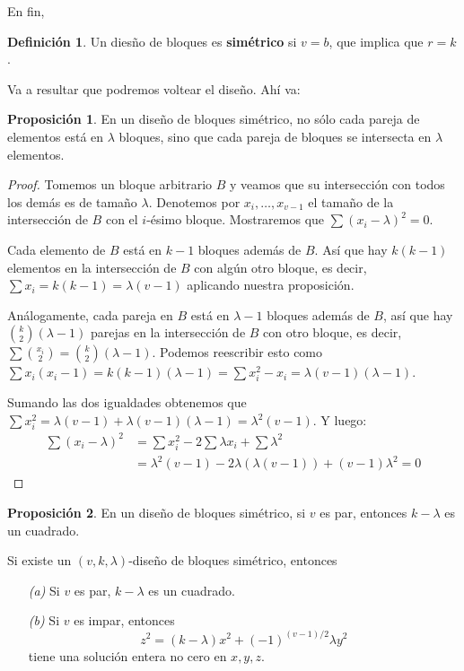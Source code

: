 \documentclass[spanish]{book}
\theoremstyle{definition}
\newtheorem*{defn}{Definición}
\newtheorem*{prop}{Proposición}
\begin{document}
En fin,
\begin{defn}
	Un diesño de bloques es \textbf{simétrico} si $v=b$, que implica que $r=k$.
\end{defn}
Va a resultar que podremos voltear el diseño. Ahí va:
\begin{prop}
	En un diseño de bloques simétrico, no sólo cada pareja de elementos está en $\lambda$ bloques, sino que cada pareja de bloques se intersecta en $\lambda$ elementos.
\end{prop}
\begin{proof}
	Tomemos un bloque arbitrario $B$ y veamos que su intersección con todos los demás es de tamaño $\lambda$. Denotemos por $x_i,\ldots,x_{v-1}$ el tamaño de la intersección de $B$ con el $i$-ésimo bloque. Mostraremos que $\sum(x_i-\lambda)^2=0$.
	
	Cada elemento de $B$ está en $k-1$ bloques además de $B$. Así que hay $k(k-1)$ elementos en la intersección de $B$ con algún otro bloque, es decir, $\sum x_i=k(k-1)=\lambda(v-1)$ aplicando nuestra proposición.
	
	Análogamente, cada pareja en $B$ está en $\lambda -1$ bloques además de $B$, así que hay ${k\choose 2}(\lambda-1)$ parejas en la intersección de $B$ con otro bloque, es decir, $\sum{x_i\choose 2}={k\choose 2}(\lambda-1)$. Podemos reescribir esto como $\sum x_i(x_i-1)=k(k-1)(\lambda-1)=\sum x_i^2-x_i=\lambda(v-1)(\lambda-1)$.
	
	Sumando las dos igualdades obtenemos que $\sum x_i^2=\lambda(v-1)+\lambda(v-1)(\lambda-1)=\lambda^2(v-1)$. Y luego:
	\begin{align*}
		\sum(x_i-\lambda)^2&=\sum x_i^2-2\sum\lambda x_i+\sum \lambda^2\\
		&=\lambda^2(v-1)-2\lambda(\lambda(v-1))+(v-1)\lambda^2=0
	\end{align*}
\end{proof}
\begin{prop}
	En un diseño de bloques simétrico, si $v$ es par, entonces $k-\lambda$ es un cuadrado.
\end{prop}
\begin{teo}
	Si existe un $(v,k,\lambda)$-diseño de bloques simétrico, entonces
	\begin{enumerate}
		\item[\textit{(a)}] Si $v$ es par, $k-\lambda$ es un cuadrado.
		\item[\textit{(b)}] Si $v$ es impar, entonces
		\[z^2=(k-\lambda)x^2+(-1)^{(v-1)/2}\lambda y^2\]
		tiene una solución entera no cero en $x,y,z$.
	\end{enumerate}
\end{teo}
\end{document}
